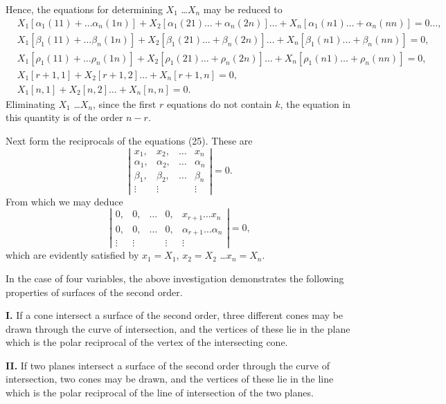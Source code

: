 \documentclass[11pt,a4paper]{article}
\theoremstyle{plain}
\theoremstyle{definition}
\theoremstyle{remark}
\begin{document}
Hence, the equations for determining $X_1$ \ldots $X_n$ may be reduced to
\begin{align*}
&X_1[\alpha_1(11) + \ldots \alpha_n(1n)] + X_2[\alpha_1(21) \ldots + \alpha_n(2n)] \ldots + X_n[\alpha_1(n1) \ldots + \alpha_n(nn)] = 0 \ldots \tag{30},\\
&X_1[\beta_1(11) + \ldots \beta_n(1n)] + X_2[\beta_1(21) \ldots + \beta_n(2n)] \ldots + X_n[\beta_1(n1) \ldots + \beta_n(nn)] = 0, \\
&X_1[\rho_1(11) + \ldots \rho_n(1n)] + X_2[\rho_1(21) \ldots + \rho_n(2n)] \ldots + X_n[\rho_1(n1) \ldots + \rho_n(nn)] = 0, \\
&X_1[r+1, 1] + X_2[r+1, 2] \ldots + X_n[r+1, n] = 0, \\
&X_1[n, 1] + X_2[n, 2] \ldots + X_n[n, n] = 0.
\end{align*}
Eliminating $X_1$ \ldots $X_n$, since the first $r$ equations do not contain $k$, the equation in
this quantity is of the order $n-r$.

Next form the reciprocals of the equations (25). These are
\[
\left|\begin{array}{cccc}
x_1, & x_2, & \ldots & x_n \\
\alpha_1, & \alpha_2, & \ldots & \alpha_n \\
\beta_1, & \beta_2, & \ldots & \beta_n \\
\vdots & \vdots & & \vdots
\end{array}\right| = 0
\tag{31}.
\]
From which we may deduce
\[
\left|\begin{array}{cccccc}
0, & 0, & \ldots & 0, & x_{r+1} \ldots x_n \\
0, & 0, & \ldots & 0, & \alpha_{r+1} \ldots \alpha_n \\
\vdots & \vdots & & \vdots & \vdots
\end{array}\right| = 0 \tag{32},
\]
which are evidently satisfied by $x_1 = X_1$, $x_2 = X_2$ \ldots $x_n = X_n$.

In the case of four variables, the above investigation demonstrates the following
properties of surfaces of the second order.

\textbf{I.} If a cone intersect a surface of the second order, three different cones may
be drawn through the curve of intersection, and the vertices of these lie in the plane
which is the polar reciprocal of the vertex of the intersecting cone.

\textbf{II.} If two planes intersect a surface of the second order through the curve of
intersection, two cones may be drawn, and the vertices of these lie in the line which
is the polar reciprocal of the line of intersection of the two planes.
\end{document}
